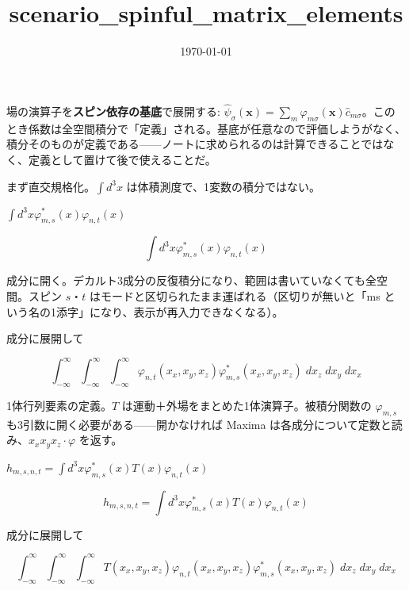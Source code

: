 \documentclass[dvipdfmx,a4paper,11pt]{jsarticle}
\title{scenario\_spinful\_matrix\_elements}
\date{\today}
\begin{document}
\maketitle

場の演算子を\textbf{スピン依存の基底}で展開する: $\hat\psi_\sigma(\mathbf x)=\sum_m \varphi_{m\sigma}(\mathbf x)\hat c_{m\sigma}$。このとき係数は全空間積分で「定義」される。基底が任意なので評価しようがなく、積分そのものが定義である——ノートに求められるのは計算できることではなく、定義として置けて後で使えることだ。

まず直交規格化。$\int d^3x$ は体積測度で、1変数の積分ではない。

$\int d^3x \varphi^{\ast}_{m,s}(x) \varphi_{n,t}(x)$

\begin{equation}
  \int d^3x \varphi^{\ast}_{m,s}(x) \varphi_{n,t}(x)
  \label{eq:E1}
\end{equation}

成分に開く。デカルト3成分の反復積分になり、範囲は書いていなくても全空間。スピン $s$・$t$ はモードと区切られたまま運ばれる（区切りが無いと「ms という名の1添字」になり、表示が再入力できなくなる）。

成分に展開して

\begin{equation}
  \int_{-\infty }^{\infty }{\int_{-\infty }^{\infty }{\int_{-\infty }^{\infty }{\varphi_{n,t}(x_{x},x_{y},x_{z}) \varphi^{\ast}_{m,s}(x_{x},x_{y},x_{z})\;dx_{z}}\;dx_{y}}\;dx_{x}}
  \label{eq:E2}
\end{equation}

1体行列要素の定義。$T$ は運動＋外場をまとめた1体演算子。被積分関数の $\varphi_{m,s}$ も3引数に開く必要がある——開かなければ Maxima は各成分について定数と読み、$x_x x_y x_z \cdot \varphi$ を返す。

$h_{m,s,n,t} = \int d^3x \varphi^{\ast}_{m,s}(x) T(x) \varphi_{n,t}(x)$

\begin{equation}
  h_{m,s,n,t} = \int d^3x \varphi^{\ast}_{m,s}(x) T(x) \varphi_{n,t}(x)
  \label{eq:E3}
\end{equation}

成分に展開して

\begin{equation}
  \int_{-\infty }^{\infty }{\int_{-\infty }^{\infty }{\int_{-\infty }^{\infty }{T\left(x_{x} , x_{y} , x_{z}\right) \varphi_{n,t}(x_{x},x_{y},x_{z}) \varphi^{\ast}_{m,s}(x_{x},x_{y},x_{z})\;dx_{z}}\;dx_{y}}\;dx_{x}}
  \label{eq:E4}
\end{equation}
\end{document}
